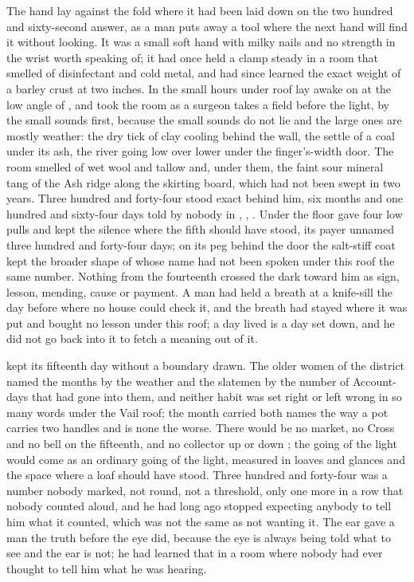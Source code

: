 
The hand lay against the fold where it had been laid down on the two hundred and sixty-second answer, as a man puts away a tool where the next hand will find it without looking. It was a small soft hand with milky nails and no strength in the wrist worth speaking of; it had once held a clamp steady in a room that smelled of disinfectant and cold metal, and had since learned the exact weight of a barley crust at two inches. In the small hours under  roof  lay awake on  at the low angle of , and took the room as a surgeon takes a field before the light, by the small sounds first, because the small sounds do not lie and the large ones are mostly weather: the dry tick of clay cooling behind the wall, the settle of a coal under its ash, the river going low over lower under the finger's-width door. The room smelled of wet wool and tallow and, under them, the faint sour mineral tang of the Ash ridge along the skirting board, which had not been swept in two years. Three hundred and forty-four stood exact behind him, six months and one hundred and sixty-four days told by nobody in , , . Under the floor  gave four low pulls and kept the silence where the fifth should have stood, its payer unnamed three hundred and forty-four days; on its peg behind the door the salt-stiff coat kept the broader shape of  whose name had not been spoken under this roof the same number. Nothing from the fourteenth crossed the dark toward him as sign, lesson, mending, cause or payment. A man had held a breath at a knife-sill the day before where no house could check it, and the breath had stayed where it was put and bought no lesson under this roof; a day lived is a day set down, and he did not go back into it to fetch a meaning out of it.

 kept its fifteenth day without a boundary drawn. The older women of the district named the months by the weather and the slatemen by the number of Account-days that had gone into them, and neither habit was set right or left wrong in so many words under the Vail roof; the month carried both names the way a pot carries two handles and is none the worse. There would be no market, no Cross and no bell on the fifteenth, and no collector up or down ; the going of the light would come as an ordinary going of the light, measured in loaves and glances and the space where a loaf should have stood. Three hundred and forty-four was a number nobody marked, not round, not a threshold, only one more in a row that nobody counted aloud, and he had long ago stopped expecting anybody to tell him what it counted, which was not the same as not wanting it. The ear gave a man the truth before the eye did, because the eye is always being told what to see and the ear is not; he had learned that in a room where nobody had ever thought to tell him what he was hearing.

